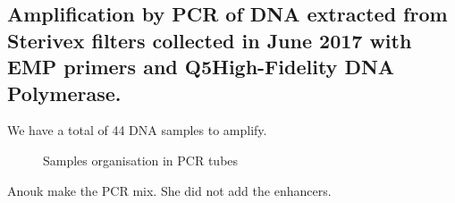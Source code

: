 \subsection{Amplification by PCR of DNA extracted from Sterivex filters collected in June 2017 with EMP primers and Q5\cR High-Fidelity DNA Polymerase.}
\label{task:20180120_cj1}

We have a total of 44 DNA samples to amplify. 

\begin{figure}[htbp]
\caption{Samples organisation in PCR tubes}
\label{tikz:20180120_pcr_racks}

\end{figure}

Anouk make the PCR mix. She did not add the enhancers.


